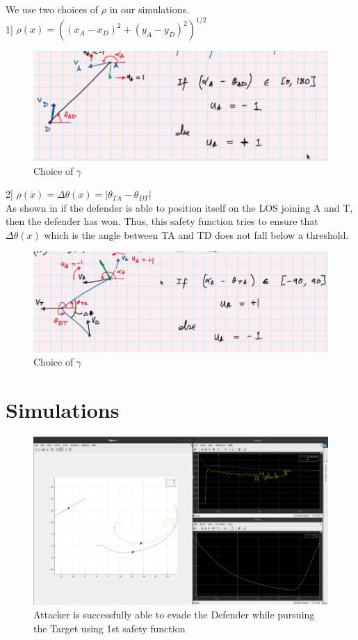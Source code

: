 \documentclass[11pt]{article}
\theoremstyle{definition}
\theoremstyle{remark}
\begin{document}
We use two choices of $\rho$ in our simulations.\\
1] $\rho(x) = ((x_A - x_D)^2 + (y_A - y_D)^2)^{1/2}$\\
\begin{figure}
    \centering
    \includegraphics[width=1\textwidth]{tad_approach1_1.png}
    \caption{Choice of $\gamma$}
\end{figure}
2] $\rho(x) = \Delta \theta(x) = |\theta_{TA} - \theta_{DT}|$\\
As shown in \cite{shima} if the defender is able to position itself on the LOS joining A and T, then the defender has won. Thus, this safety function tries to ensure that $\Delta \theta(x)$ which is the angle between TA and TD does not fall below a threshold.
\begin{figure}
    \centering
    \includegraphics[width=1\textwidth]{tad_approach1_2.png}
    \caption{Choice of $\gamma$}
\end{figure}


\section{Simulations}\label{sec:5}
\begin{figure}
    \centering
    \includegraphics[width=1\textwidth]{sim2_case1.png}
    \caption{Attacker is successfully able to evade the Defender while pursuing the Target using 1st safety function}
\end{figure}
\end{document}
